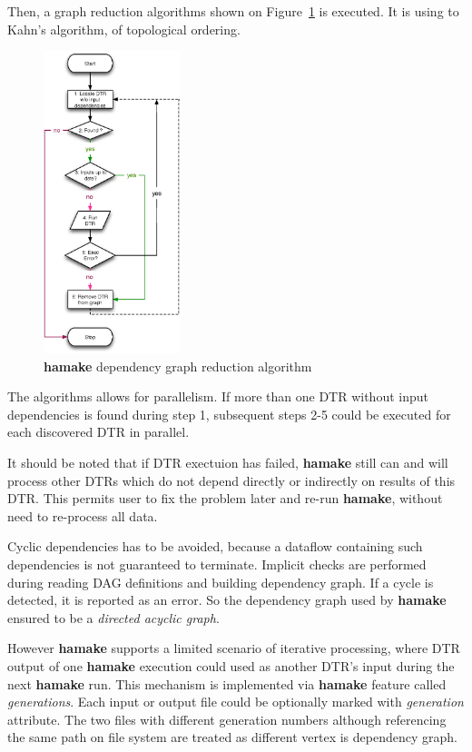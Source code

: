 \documentclass[10pt,conference,letterpaper]{IEEEtran}
\begin{document}
Then, a graph reduction algorithms shown on Figure~\ref{fig:grred} is
executed. It is using to Kahn's algorithm\cite{kahn1962topological},
of topological ordering.

\begin{figure}[htp]
\centering
\includegraphics[width=4cm]{GraphReduction.eps}
\caption{\textbf{hamake} dependency graph reduction algorithm}
\label{fig:grred}
\end{figure}

The algorithms allows for parallelism. If more than one DTR without
input dependencies is found during step 1, subsequent steps 2-5 could
be executed for each discovered DTR in parallel.

It should be noted that if DTR exectuion has failed, \textbf{hamake} still can
and will process other DTRs which do not depend directly or indirectly
on results of this DTR. This permits user to fix the problem later and
re-run \textbf{hamake}, without need to re-process all data.

Cyclic dependencies has to be avoided, because a dataflow containing
such dependencies is not guaranteed to terminate. Implicit checks are
performed during reading DAG definitions and building dependency
graph. If a cycle is detected, it is reported as an error. So the
dependency graph used by \textbf{hamake} ensured to be a
\textit{directed acyclic graph}.

However \textbf{hamake} supports a limited scenario of iterative
processing, where DTR output of one \textbf{hamake} execution could used as
another DTR's input during the next \textbf{hamake} run. This mechanism is
implemented via \textbf{hamake} feature called
\textit{generations}. Each input or output file could be optionally
marked with \emph{generation} attribute. The two files with different
generation numbers although referencing the same path on file system
are treated as different vertex is dependency graph.
\end{document}

